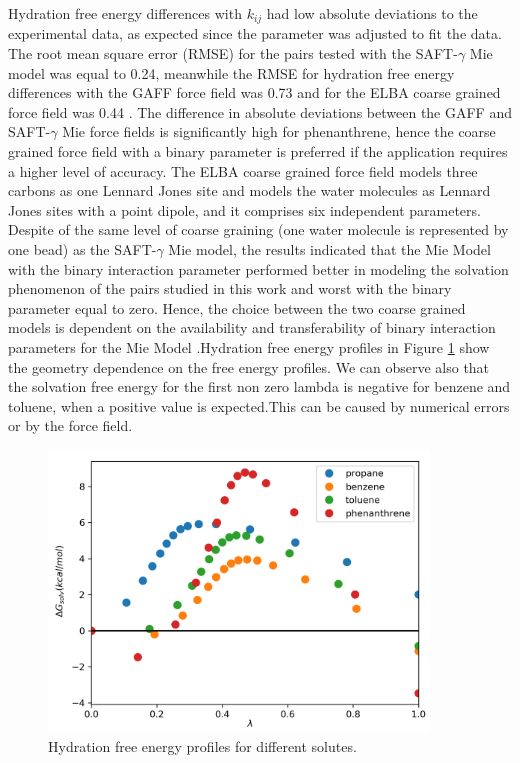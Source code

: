 Hydration free energy differences with $k_{ij}$ had low absolute deviations to the experimental data, as expected since the parameter was adjusted to fit the data. The root mean square error (RMSE) for the pairs tested with the SAFT-$\gamma$ 	Mie model was equal to 0.24, meanwhile the RMSE for hydration free energy differences with the GAFF force field \cite{PMID:24928188} was 0.73 and for the ELBA coarse grained force field was 0.44 \cite{doi:10.1021/acs.jctc.5b00963}. The difference in absolute deviations between the GAFF and SAFT-$\gamma$ 	Mie force fields is significantly high for phenanthrene, hence the coarse grained force field with a binary parameter is preferred if the application requires a higher level of accuracy. The ELBA coarse grained force field models three carbons as one Lennard Jones site and models the water molecules as Lennard Jones sites with a point dipole, and it comprises six independent parameters. Despite of the same level of coarse graining (one water molecule is represented by one bead) as the SAFT-$\gamma$ 	Mie model, the results indicated that the Mie Model with the binary interaction parameter performed better in modeling the solvation phenomenon of the pairs studied in this work and worst with the binary parameter equal to zero. Hence, the choice between the two coarse grained models is dependent on the availability and transferability  of binary interaction parameters for the Mie Model .Hydration free energy profiles in Figure \ref{fig:water} show the geometry  dependence on the free energy profiles. We can observe also that the solvation free energy for the first non zero lambda is negative for benzene and toluene, when a positive value is expected.This can be caused by numerical errors or by the force field. 

\begin{figure}[H]
\centering
\includegraphics[width=0.9\textwidth]{Figures/water}
\caption{Hydration free energy profiles for different solutes.}
\label{fig:water}
\end{figure}

